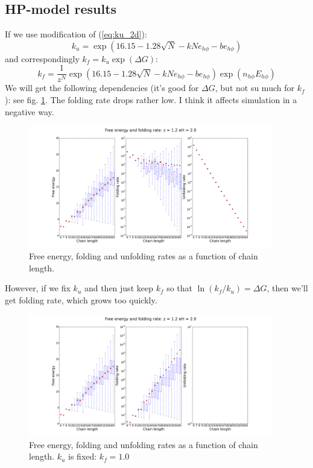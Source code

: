 \documentclass[12pt]{paper}
\newcommand{\gD}{\Delta}
\begin{document}
\subsection{HP-model results}
If we use modification of (\ref{eq:ku_2d}):
\begin{equation}
 k_u = \exp(16.15-1.28 \sqrt{N} -kNe_{h\phi} -be_{h\phi})
\end{equation}
and correspondingly $k_f=k_u\exp(\gD G)$:
 \begin{equation}
 k_f = \frac{1}{z^N}\exp(16.15-1.28 \sqrt{N} -kNe_{h\phi} -be_{h\phi})\exp(n_{h\phi}E_{h\phi})
\end{equation} 
We will get the following dependencies (it's good for $\gD G$, but not su much for $k_f$): see 
fig. \ref{fig:fold_new}. The folding rate drops rather low. I think it affects simulation in a 
negative way.
\begin{figure}[h!]
  \centering
  \includegraphics[width=0.95\textwidth]{pictures/foldingModel1.png} 
  \caption{Free energy, folding and unfolding rates as a function of chain length. }
  \label{fig:fold_new}
\end{figure}  
However, if we fix $k_u$ and then just keep $k_f$ so that $\ln(k_f/k_u)=\gD G$,
then we'll get folding rate, which grows too quickly.
\begin{figure}[h!]
  \centering
  \includegraphics[width=0.95\textwidth]{pictures/foldingModel2.png} 
  \caption{Free energy, folding and unfolding rates as a function of chain length. $k_u$ is fixed: 
$k_f=1.0$ }
  \label{fig:fold_old_n_z}
\end{figure} 
\end{document}
